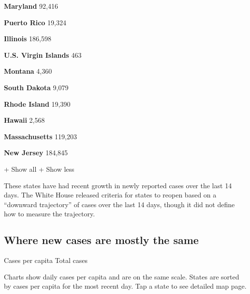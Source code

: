 \textbf{Maryland} 92,416

\href{https://www.nytimes3xbfgragh.onion/interactive/2020/us/puerto-rico-coronavirus-cases.html}{}

\textbf{Puerto Rico} 19,324

\href{https://www.nytimes3xbfgragh.onion/interactive/2020/us/illinois-coronavirus-cases.html}{}

\textbf{Illinois} 186,598

\textbf{U.S. Virgin Islands} 463

\href{https://www.nytimes3xbfgragh.onion/interactive/2020/us/montana-coronavirus-cases.html}{}

\textbf{Montana} 4,360

\href{https://www.nytimes3xbfgragh.onion/interactive/2020/us/south-dakota-coronavirus-cases.html}{}

\textbf{South Dakota} 9,079

\href{https://www.nytimes3xbfgragh.onion/interactive/2020/us/rhode-island-coronavirus-cases.html}{}

\textbf{Rhode Island} 19,390

\href{https://www.nytimes3xbfgragh.onion/interactive/2020/us/hawaii-coronavirus-cases.html}{}

\textbf{Hawaii} 2,568

\href{https://www.nytimes3xbfgragh.onion/interactive/2020/us/massachusetts-coronavirus-cases.html}{}

\textbf{Massachusetts} 119,203

\href{https://www.nytimes3xbfgragh.onion/interactive/2020/us/new-jersey-coronavirus-cases.html}{}

\textbf{New Jersey} 184,845

+ Show all + Show less

These states have had recent growth in newly reported cases over the
last 14 days. The White House released criteria for states to reopen
based on a ``downward trajectory'' of cases over the last 14 days,
though it did not define how to measure the trajectory.

\hypertarget{where-new-cases-are-mostly-the-same}{%
\subsection{Where new cases are mostly the
same}\label{where-new-cases-are-mostly-the-same}}

Cases per capita Total cases

Charts show daily cases per capita and are on the same scale. States are
sorted by cases per capita for the most recent day. Tap a state to see
detailed map page.

